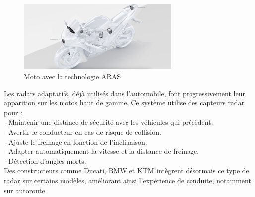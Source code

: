 \begin{figure}[H]
    \centering
    \includegraphics[width=0.7\textwidth]{images/aras_moto.jpeg} 
    \caption{Moto avec la technologie ARAS}
\end{figure}

Les radars adaptatifs, déjà utilisés dans l’automobile, font progressivement leur apparition sur les motos haut de gamme. Ce système utilise des capteurs radar pour :\\
- Maintenir une distance de sécurité avec les véhicules qui précèdent.\\
- Avertir le conducteur en cas de risque de collision.\\
- Ajuste le freinage en fonction de l'inclinaison.\\
- Adapter automatiquement la vitesse et la distance de freinage.\\
- Détection d'angles morts.\\
Des constructeurs comme Ducati, BMW et KTM intègrent désormais ce type de radar sur certains modèles, améliorant ainsi l’expérience de conduite, notamment sur autoroute.

